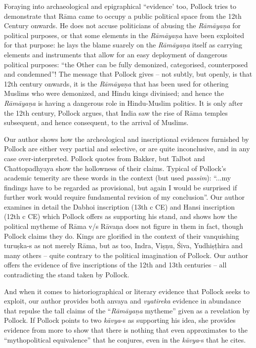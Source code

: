Foraying into archaeological and epigraphical “evidence’ too, Pollock tries to demonstrate that Rāma came to occupy a public political space from the 12th Century onwards. He does not accuse politicians of abusing the {\sl Rāmāyaṇa} for political purposes, or that some elements in the {\sl Rāmāyaṇa} have been exploited for that purpose: he lays the blame suarely on the {\sl Rāmāyaṇa} itself as carrying elements and instruments that allow for an easy deployment of dangerous political purposes: “the Other can be fully demonized, categorised, counterposed and condemned”! The message that Pollock gives -- not subtly, but openly, is that 12th century onwards, it is the {\sl Rāmāyaṇa} that has been used for othering Muslims who were demonized, and Hindu kings divinised; and hence the {\sl Rāmāyaṇa} is having a dangerous role in Hindu-Muslim politics. It is only after the 12th century, Pollock argues, that India saw the rise of Rāma temples subsequent, and hence consequent, to the arrival of Muslims.

Our author shows how the archeological and inscriptional evidences furnished by Pollock are either very partial and selective, or are quite inconclusive, and in any case over-interpreted. Pollock quotes from Bakker, but Talbot and Chattopadhyaya show the hollowness of their claims. Typical of Pollock’s academic temerity are these words in the context (but used {\sl passim}): “...my findings have to be regarded as provisional, but again I would be surprised if further work would require fundamental revision of my conclusion”. Our author examines in detail the Dabhoi inscription (13th c CE) and Hansi inscription (12th c CE) which Pollock offers as supporting his stand, and shows how the political mytheme of Rāma v/s Rāvaṇa does not figure in them in fact, though Pollock claims they do. Kings are glorified in the context of their vanquishing turuṣka-s as not merely Rāma, but as too, Indra, Viṣṇu, Śiva, Yudhiṣṭhira and many others -- quite contrary to the political imagination of Pollock. Our author offers the evidence of five inscriptions of the 12th and 13th centuries -- all contradicting the stand taken by Pollock.

And when it comes to historiographical or literary evidence that Pollock seeks to exploit, our author provides both anvaya and {\sl vyatireka} evidence in abundance that repulse the tall claims of  the “{\sl Rāmāyaṇa} mytheme” given as a revelation by Pollock. If Pollock points to two {\sl kāvya}-s as supporting his idea, she provides evidence from more to show that there is nothing that even approximates to the “mythopolitical equivalence” that he conjures, even in the {\sl kāvya}-s that he cites.

